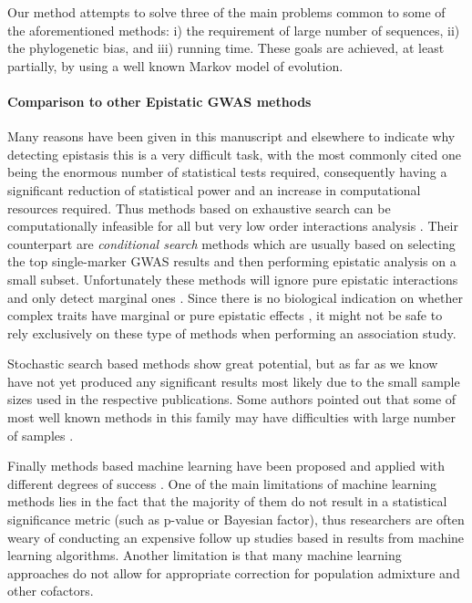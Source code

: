 Our method attempts to solve three of the main problems common to some of the aforementioned methods: 
i) the requirement of large number of sequences, 
ii) the phylogenetic bias, and
iii) running time.
These goals are achieved, at least partially, by using a well known Markov model of evolution.

\paragraph{Comparison to other Epistatic GWAS methods}
Many reasons have been given in this manuscript and elsewhere to indicate why detecting epistasis this is a very difficult task, with the most commonly cited one being the enormous number of statistical tests required, consequently having a significant reduction of statistical power and an increase in computational resources required.
Thus methods based on exhaustive search can be computationally infeasible for all but very low order interactions analysis \cite{cordell2009detecting}.
Their counterpart are \textit{conditional search} methods \cite{li2011detecting} which are usually based on selecting the top single-marker GWAS results and then performing epistatic analysis on a small subset.
Unfortunately these methods will ignore pure epistatic interactions and only detect marginal ones \cite{li2011detecting,cordell2002epistasis}.
Since there is no biological indication on whether complex traits have marginal or pure epistatic effects \cite{culverhouse2002perspective,zuk2012mystery,li2011detecting}, it might not be safe to rely exclusively on these type of methods when performing an  association study.

Stochastic search based methods \cite{zhang2007bayesian} show great potential, but as far as we know have not yet produced any significant results most likely due to the small sample sizes used in the respective publications. 
Some authors pointed out that some of most well known methods in this family may have difficulties with large number of samples \cite{de2013emerging}.

Finally methods based machine learning have been proposed and applied with different degrees of success \cite{koo2013review, cordell2009detecting, li2011detecting}.
One of the main limitations of machine learning methods lies in the fact that the majority of them do not result in a statistical significance metric (such as p-value or Bayesian factor), thus researchers are often weary of conducting an expensive follow up studies based in results from machine learning algorithms.
Another limitation is that many machine learning approaches do not allow for appropriate correction for population admixture and other cofactors.

